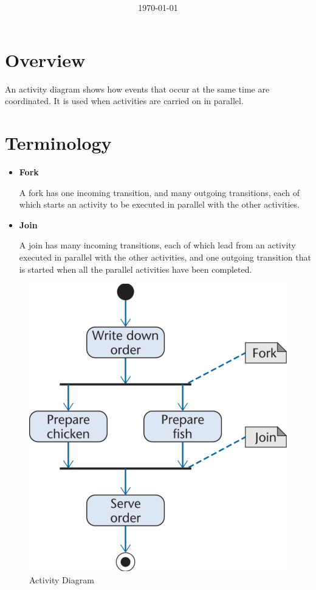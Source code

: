 \documentclass[11pt]{article}
\title{\textbf{\Topic}}
\author{\Name}
\date{\today}
\begin{document}
\maketitle
\noindent\makebox[\linewidth]{\rule[8pt]{5in}{0.5pt}}

\section*{Overview}

An activity diagram shows how events that occur at the same time are coordinated. It is used when activities are carried on in parallel.

\section*{Terminology}

\begin{itemize}

	\item \textbf{Fork}
	
	A fork has one incoming transition, and many outgoing transitions, each of which starts an activity to be executed in parallel with the other activities.
	
	\item \textbf{Join}
	
	A join has many incoming transitions, each of which lead from an activity executed in parallel with the other activities, and one outgoing transition that is started when all the parallel activities have been completed.
	
\end{itemize}

\begin{figure}[h]
	\centering
	\includegraphics[width=0.45\linewidth]{images/ActivityDiagram.png}
	\caption{Activity Diagram}
	\label{fig:ActivityDiagram}
\end{figure}
\end{document}
